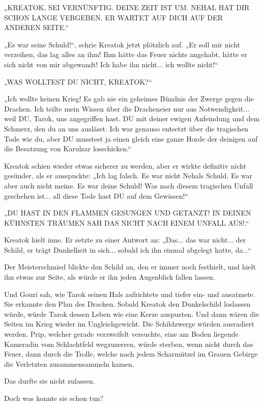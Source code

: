 \documentclass[10pt, a4paper, oneside]{book}
\begin{document}
„KREATOK, SEI VERNÜNFTIG. DEINE ZEIT IST UM. NEHAL HAT DIR SCHON LANGE VERGEBEN. ER WARTET AUF DICH AUF DER ANDEREN SEITE.“

„Es war seine Schuld!“, schrie Kreatok jetzt plötzlich auf. „Er soll mir nicht verzeihen, das lag alles an ihm! Ihm hätte das Feuer nichts angehabt, hätte er sich nicht von mir abgewandt! Ich habe ihn nicht... ich wollte nicht!“

„WAS WOLLTEST DU NICHT, KREATOK?“

„Ich wollte keinen Krieg! Es gab nie ein geheimes Bündnis der Zwerge gegen die Drachen. Ich teilte mein Wissen über die Dracheneier nur aus Notwendigkeit... weil DU, Tarok, uns angegriffen hast. DU mit deiner ewigen Anfeindung und dem Schmerz, den du an uns auslässt. Ich war genauso entsetzt über die tragischen Tode wie du, aber DU musstest ja einen gleich eine ganze Horde der deinigen auf die Besatzung von Karulzar losschicken.“

Kreatok schien wieder etwas sicherer zu werden, aber er wirkte definitiv nicht gesünder, als er ausspuckte: „Ich lag falsch. Es war nicht Nehals Schuld. Es war aber auch nicht meine. Es war deine Schuld! Was nach diesem tragischen Unfall geschehen ist... all diese Tode hast DU auf dem Gewissen!“

„DU HAST IN DEN FLAMMEN GESUNGEN UND GETANZT! IN DEINEN KÜHNSTEN TRÄUMEN SAH DAS NICHT NACH EINEM UNFALL AUS!.“

Kreatok hielt inne. Er setzte zu einer Antwort an: „Das... das war nicht... der Schild, er trägt Dunkelheit in sich... sobald ich ihn einmal abgelegt hatte, da...“

Der Meisterschmied blickte den Schild an, den er immer noch festhielt, und hielt ihn etwas zur Seite, als würde er ihn jeden Augenblick fallen lassen.

Und Gouri sah, wie Tarok seinen Hals aufrichtete und tiefer ein- und ausatmete. Sie erkannte den Plan des Drachen. Sobald Kreatok den Dunkelschild loslassen würde, würde Tarok dessen Leben wie eine Kerze auspusten. Und dann wären die Seiten im Krieg wieder im Ungleichgewicht. Die Schildzwerge würden ausradiert werden. Prip, welcher gerade verzweifelt versuchte, eine am Boden liegende Kameradin vom Schlachtfeld wegzuzerren, würde sterben, wenn nicht durch das Feuer, dann durch die Trolle, welche nach jedem Scharmützel im Grauen Gebirge die Verletzten zusammensammeln kamen.

Das durfte sie nicht zulassen.

Doch was konnte sie schon tun?
\end{document}
